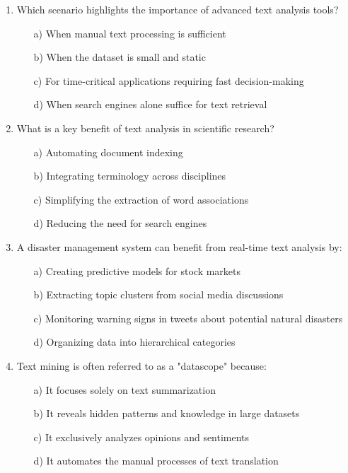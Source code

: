 \documentclass[8pt]{extarticle}
\begin{document}
\begin{multicols}{2}
\begin{enumerate}
\item Which scenario highlights the importance of advanced text analysis tools?
\begin{itemize}
\item[a)] When manual text processing is sufficient
\item[b)] When the dataset is small and static
\item[c)] For time-critical applications requiring fast decision-making
\item[d)] When search engines alone suffice for text retrieval
\end{itemize}

\item What is a key benefit of text analysis in scientific research?
\begin{itemize}
\item[a)] Automating document indexing
\item[b)] Integrating terminology across disciplines
\item[c)] Simplifying the extraction of word associations
\item[d)] Reducing the need for search engines
\end{itemize}

\item A disaster management system can benefit from real-time text analysis by:
\begin{itemize}
\item[a)] Creating predictive models for stock markets
\item[b)] Extracting topic clusters from social media discussions
\item[c)] Monitoring warning signs in tweets about potential natural disasters
\item[d)] Organizing data into hierarchical categories
\end{itemize}

\item Text mining is often referred to as a "datascope" because:
\begin{itemize}
\item[a)] It focuses solely on text summarization
\item[b)] It reveals hidden patterns and knowledge in large datasets
\item[c)] It exclusively analyzes opinions and sentiments
\item[d)] It automates the manual processes of text translation
\end{itemize}


\end{enumerate}
\end{multicols}
\end{document}
